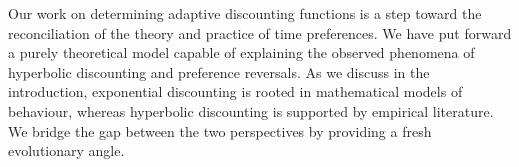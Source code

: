 \documentclass[titlepage, hidelinks, 12pt]{article}
\theoremstyle{plain}
\theoremstyle{remark}
\theoremstyle{definition}
\begin{document}
Our work on determining adaptive discounting functions is a step toward the reconciliation of the theory and practice of time preferences. 
We have put forward a purely theoretical model capable of explaining the observed phenomena of hyperbolic discounting and preference
reversals. 
As
we discuss in the introduction, exponential discounting is rooted in mathematical models of behaviour, whereas hyperbolic discounting is supported
by empirical literature. We bridge the gap between the two perspectives by providing a fresh evolutionary angle. 





\newpage

{}
\end{document}
